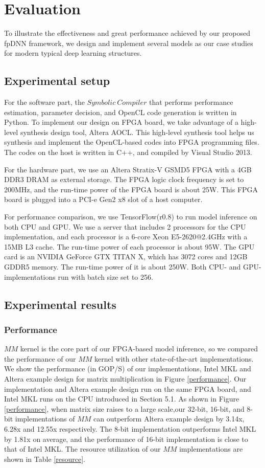 \documentclass{acm_proc_article-sp-copy}
\begin{document}
\section{Evaluation}
To illustrate the effectiveness and great performance achieved by our proposed fpDNN framework, we design and implement several models as our case studies for modern typical deep learning structures. 

\subsection{Experimental setup}
For the software part, the $Symbolic\ Compiler$ that performs performance estimation, parameter decision, and OpenCL code generation is written in Python. To implement our design on FPGA board, we take advantage of a high-level synthesis design tool, Altera AOCL. This high-level synthesis tool helps us synthesis and implement the OpenCL-based codes into FPGA programming files. The codes on the host is written in C++, and compiled by Visual Studio 2013.

For the hardware part, we use an Altera Stratix-V GSMD5 FPGA with a 4GB DDR3 DRAM as external storage. The FPGA logic clock frequency is set to 200MHz, and the run-time power of the FPGA board is about 25W. This FPGA board is plugged into a PCI-e Gen2 x8 slot of a host computer. 

For performance comparison, we use TensorFlow(r0.8) to run model inference on both CPU and GPU. We use a server that includes 2 processors for the CPU implementation, and each processor is a 6-core Xeon E5-2620@2.4GHz with a 15MB L3 cache. The run-time power of each processor is about 95W. The GPU card is an NVIDIA GeForce GTX TITAN X, which has 3072 cores and 12GB GDDR5 memory. The run-time power of it is about 250W. Both CPU- and GPU- implementations run with batch size set to 256.


\subsection{Experimental results}

\subsubsection{Performance}
$MM$ kernel is the core part of our FPGA-based model inference, so we compared the performance of our $MM$ kernel with other state-of-the-art implementations. We show the performance (in GOP/S) of our implementations, Intel MKL \cite{mkl} and Altera example design for matrix multiplication \cite{altera} in Figure \ref{performance}. Our implementation and Altera example design run on the same FPGA board, and Intel MKL runs on the CPU introduced in Section 5.1. As shown in Figure \ref{performance}, when matrix size raises to a large scale,our 32-bit, 16-bit, and 8-bit implementations of $MM$ can outperform Altera example design by 3.14x, 6.28x and 12.55x respectively. The 8-bit implementation outperforms Intel MKL by 1.81x on average, and the performance of 16-bit implementation is close to that of Intel MKL. The resource utilization of our $MM$ implementations are shown in Table \ref{resource}.
\end{document}
